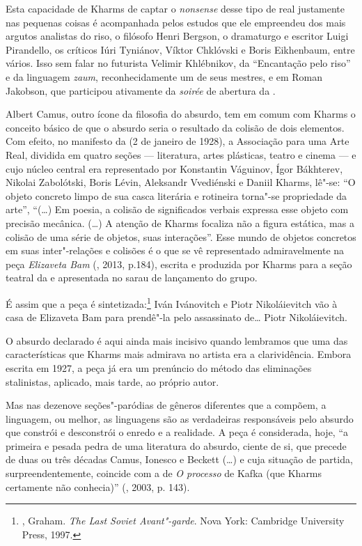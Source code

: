 Esta capacidade de Kharms de captar o \emph{nonsense} desse tipo de real
justamente nas pequenas coisas é acompanhada pelos estudos que ele
empreendeu dos mais argutos analistas do riso, o filósofo Henri Bergson,
o dramaturgo e escritor Luigi Pirandello, os críticos Iúri Tyniánov,
Víktor Chklóvski e Boris Eikhenbaum, entre vários. Isso sem falar no
futurista Velimir Khlébnikov, da ``Encantação pelo riso'' e da linguagem
\emph{zaum}, reconhecidamente um de seus mestres, e em Roman Jakobson,
que participou ativamente da \emph{soirée} de abertura da
.

Albert Camus, outro ícone da filosofia do absurdo, tem em comum com
Kharms o conceito básico de que o absurdo seria o resultado da colisão
de dois elementos. Com efeito, no manifesto da  (2 de
janeiro de 1928), a Associação para uma Arte Real, dividida em quatro
seções --- literatura, artes plásticas, teatro e cinema --- e cujo núcleo
central era representado por Konstantin Váguinov, Ígor Bákhterev,
Nikolai Zabolótski, Boris Lévin, Aleksandr Vvediénski e Daniil Kharms,
lê"-se: ``O objeto concreto limpo de sua casca literária e rotineira
torna"-se propriedade da arte'', ``(\ldots{}) Em poesia, a colisão de
significados verbais expressa esse objeto com precisão mecânica.
(\ldots{}) A atenção de Kharms focaliza não a figura estática, mas a
colisão de uma série de objetos, suas interações''. Esse mundo de
objetos concretos em suas inter"-relações e colisões é o que se vê
representado admiravelmente na peça \emph{Elizaveta Bam} (, 2013, p.184), escrita
e produzida por Kharms para a seção teatral da  e
apresentada no sarau de lançamento do grupo.

É assim que a peça é sintetizada:\footnote{, Graham. \emph{The Last Soviet Avant"-garde}. Nova York: Cambridge University Press, 1997.} Iván Ivánovitch e Piotr Nikoláievitch vão à casa de Elizaveta Bam para
prendê"-la pelo assassinato de\ldots{} Piotr Nikoláievitch.

O absurdo declarado é aqui ainda mais incisivo quando lembramos que uma
das características que Kharms mais admirava no artista era a
clarividência. Embora escrita em 1927, a peça já era um prenúncio do
método das eliminações stalinistas, aplicado, mais tarde, ao próprio
autor.

Mas nas dezenove seções"-paródias de gêneros diferentes que a compõem, a
linguagem, ou melhor, as linguagens são as verdadeiras responsáveis pelo
absurdo que constrói e desconstrói o enredo e a realidade. A peça é
considerada, hoje, ``a primeira e pesada pedra de uma literatura do
absurdo, ciente de si, que precede de duas ou
três décadas Camus, Ionesco e Beckett (\ldots{}) e cuja situação de
partida, surpreendentemente, coincide com a de \emph{O processo}
de Kafka (que Kharms certamente não conhecia)'' (, 2003, p. 143).

